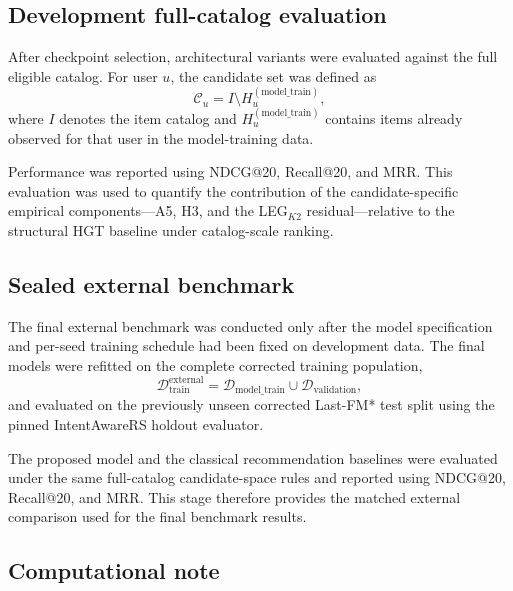 \subsection{Development full-catalog evaluation}
\label{sec:lastfm-fullcatalog}

After checkpoint selection, architectural variants were evaluated against the full eligible catalog.
For user $u$, the candidate set was defined as
\begin{equation}
\label{eq:lastfm-Cu}
\mathcal{C}_u=I\setminus H_u^{(\mathrm{model\_train})},
\end{equation}
where $I$ denotes the item catalog and $H_u^{(\mathrm{model\_train})}$ contains items already observed for that user in the model-training data.

Performance was reported using NDCG@20, Recall@20, and MRR.
This evaluation was used to quantify the contribution of the candidate-specific empirical components---A5, H3, and the LEG$_{K2}$ residual---relative to the structural HGT baseline under catalog-scale ranking.

\subsection{Sealed external benchmark}
\label{sec:lastfm-sealed}

The final external benchmark was conducted only after the model specification and per-seed training schedule had been fixed on development data.
The final models were refitted on the complete corrected training population,
\begin{equation}
\label{eq:lastfm-Dtrain-ext}
\mathcal{D}_{\mathrm{train}}^{\mathrm{external}}
=
\mathcal{D}_{\mathrm{model\_train}}
\cup
\mathcal{D}_{\mathrm{validation}},
\end{equation}
and evaluated on the previously unseen corrected Last-FM* test split using the pinned IntentAwareRS holdout evaluator.

The proposed model and the classical recommendation baselines were evaluated under the same full-catalog candidate-space rules and reported using NDCG@20, Recall@20, and MRR.
This stage therefore provides the matched external comparison used for the final benchmark results.

\subsection{Computational note}
\label{sec:lastfm-compute}

